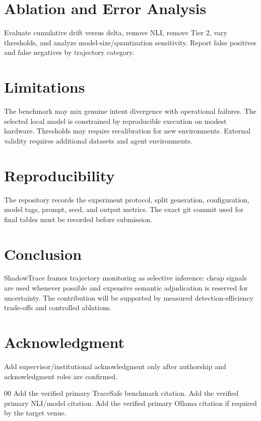 \documentclass[conference]{IEEEtran}
\begin{document}
\section{Ablation and Error Analysis}
Evaluate cumulative drift versus delta, remove NLI, remove Tier 2, vary thresholds, and analyze model-size/quantization sensitivity. Report false positives and false negatives by trajectory category.

\section{Limitations}
The benchmark may mix genuine intent divergence with operational failures. The selected local model is constrained by reproducible execution on modest hardware. Thresholds may require recalibration for new environments. External validity requires additional datasets and agent environments.

\section{Reproducibility}
The repository records the experiment protocol, split generation, configuration, model tags, prompt, seed, and output metrics. The exact git commit used for final tables must be recorded before submission.

\section{Conclusion}
ShadowTrace frames trajectory monitoring as selective inference: cheap signals are used whenever possible and expensive semantic adjudication is reserved for uncertainty. The contribution will be supported by measured detection-efficiency trade-offs and controlled ablations.

\section*{Acknowledgment}
Add supervisor/institutional acknowledgment only after authorship and acknowledgment roles are confirmed.

\begin{thebibliography}{00}
 Add the verified primary TraceSafe benchmark citation.
 Add the verified primary NLI/model citation.
 Add the verified primary Ollama citation if required by the target venue.
\end{thebibliography}
\end{document}
